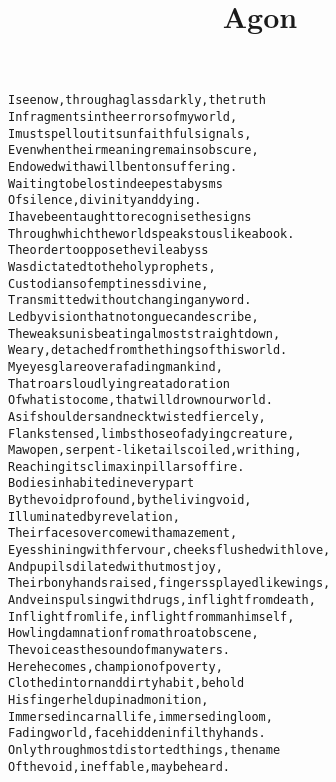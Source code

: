 \documentclass{article}
\title{Agon}
\begin{document}
\maketitle

\clearpage

\begin{alltt}\normalfont
I see now, through a glass darkly, the truth
In fragments in the errors of my world,
I must spell out its unfaithful signals,
Even when their meaning remains obscure,
Endowed with a will bent on suffering.
Waiting to be lost in deepest abysms
Of silence, divinity and dying.
I have been taught to recognise the signs
Through which the world speaks to us like a book.
The order to oppose the vile abyss
Was dictated to the holy prophets,
Custodians of emptiness divine,
Transmitted without changing any word.
Led by vision that no tongue can describe,
The weak sun is beating almost straight down,
Weary, detached from the things of this world.
My eyes glare over a fading mankind,
That roars loudly in great adoration
Of what is to come, that will drown our world.
As if shoulders and neck twisted fiercely,
Flanks tensed, limbs those of a dying creature,
Maw open, serpent-like tails coiled, writhing,
Reaching its climax in pillars of fire.
Bodies inhabited in every part
By the void profound, by the living void,
Illuminated by revelation,
Their faces overcome with amazement,
Eyes shining with fervour, cheeks flushed with love,
And pupils dilated with utmost joy,
Their bony hands raised, fingers splayed like wings,
And veins pulsing with drugs, in flight from death,
In flight from life, in flight from man himself,
Howling damnation from a throat obscene,
The voice as the sound of many waters.
Here he comes, champion of poverty,
Clothed in torn and dirty habit, behold
His finger held up in admonition,
Immersed in carnal life, immersed in gloom,
Fading world, face hidden in filthy hands.
Only through most distorted things, the name
Of the void, ineffable, may be heard.
\end{alltt}
\end{document}
